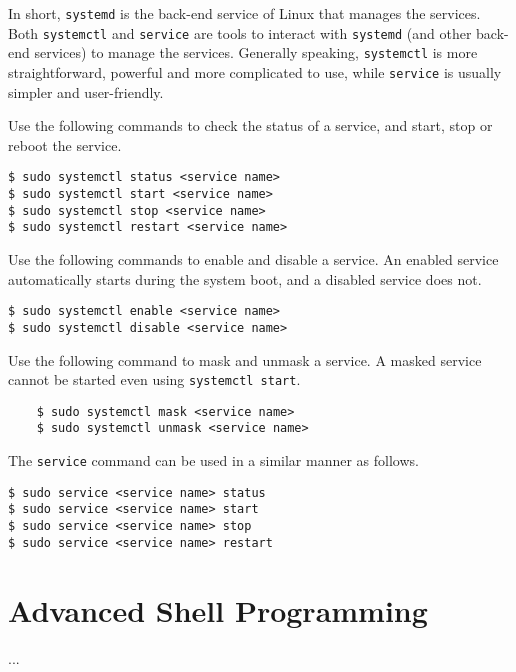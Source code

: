 In short, \verb|systemd| is the back-end service of Linux that manages the services. Both \verb|systemctl| and \verb|service| are tools to interact with \verb|systemd| (and other back-end services) to manage the services. Generally speaking, \verb|systemctl| is more straightforward, powerful and more complicated to use, while \verb|service| is usually simpler and user-friendly.

Use the following commands to check the status of a service, and start, stop or reboot the service.
\begin{lstlisting}
$ sudo systemctl status <service name>
$ sudo systemctl start <service name>
$ sudo systemctl stop <service name>
$ sudo systemctl restart <service name>
\end{lstlisting}

Use the following commands to enable and disable a service. An enabled service automatically starts during the system boot, and a disabled service does not.
\begin{lstlisting}
$ sudo systemctl enable <service name>
$ sudo systemctl disable <service name>
\end{lstlisting}

Use the following command to mask and unmask a service. A masked service cannot be started even using \verb|systemctl start|.
\begin{lstlisting}
	$ sudo systemctl mask <service name>
	$ sudo systemctl unmask <service name>
\end{lstlisting}

The \verb|service| command can be used in a similar manner as follows.
\begin{lstlisting}
$ sudo service <service name> status
$ sudo service <service name> start
$ sudo service <service name> stop
$ sudo service <service name> restart
\end{lstlisting}

\section{Advanced Shell Programming}

...
